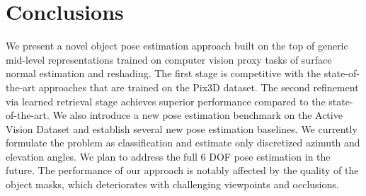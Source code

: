 \documentclass[letterpaper, 10 pt, conference]{ieeeconf}  \pdfoutput=1
\begin{document}
\section{Conclusions}
We present a novel object pose estimation approach built on the top of generic mid-level representations trained on computer vision proxy tasks
of surface normal estimation and reshading. The first stage is competitive with the state-of-the-art approaches that are trained on the Pix3D dataset. The second refinement via learned retrieval stage achieves superior performance compared to the state-of-the-art. 
We also introduce a new pose estimation benchmark on the Active Vision Dataset and establish several new pose estimation baselines. We currently formulate the problem as classification and estimate only discretized azimuth and elevation angles. We plan to address the full 6 DOF pose estimation in the future. The performance of our approach is notably affected by the quality of the object masks, which deteriorates with challenging viewpoints and occlusions.



{\renewcommand*{\bibfont}{\footnotesize}
\printbibliography
}
\end{document}
